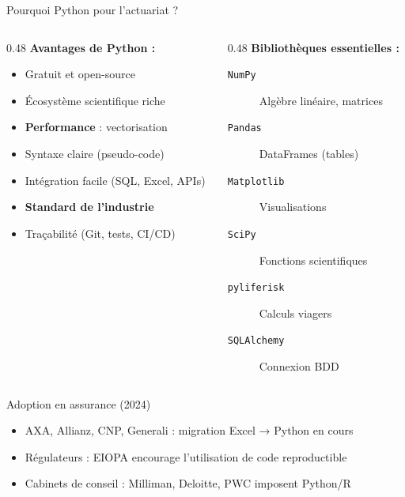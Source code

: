 \documentclass[10pt,aspectratio=169]{beamer}
\begin{document}
\begin{frame}{Pourquoi Python pour l'actuariat ?}
\begin{columns}[T]
\begin{column}{0.48\textwidth}
\textbf{Avantages de Python :}
\begin{itemize}
    \item \textcolor{vertactu}{Gratuit} et open-source
    \item Écosystème scientifique riche
    \item \textbf{Performance} : vectorisation
    \item Syntaxe claire (pseudo-code)
    \item Intégration facile (SQL, Excel, APIs)
    \item \textbf{Standard de l'industrie}
    \item Traçabilité (Git, tests, CI/CD)
\end{itemize}
\end{column}
\begin{column}{0.48\textwidth}
\textbf{Bibliothèques essentielles :}
\begin{description}
    \item[\texttt{NumPy}] Algèbre linéaire, matrices
    \item[\texttt{Pandas}] DataFrames (tables)
    \item[\texttt{Matplotlib}] Visualisations
    \item[\texttt{SciPy}] Fonctions scientifiques
    \item[\texttt{pyliferisk}] Calculs viagers
    \item[\texttt{SQLAlchemy}] Connexion BDD
\end{description}
\end{column}
\end{columns}

\vspace{0.3cm}
\begin{exampleblock}{Adoption en assurance (2024)}
\begin{itemize}
    \item AXA, Allianz, CNP, Generali : migration Excel → Python en cours
    \item Régulateurs : EIOPA encourage l'utilisation de code reproductible
    \item Cabinets de conseil : Milliman, Deloitte, PWC imposent Python/R
\end{itemize}
\end{exampleblock}
\end{frame}
\end{document}
